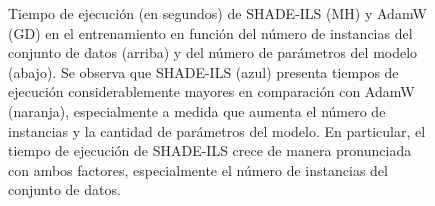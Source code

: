 \begin{figure}
    \centering
    \hfill
    \caption[Representación gráfica del tiempo de ejecución de los algoritmos SHADE-ILS y AdamW en función del número de parámetros del modelo]{Tiempo de ejecución (en segundos) de SHADE-ILS (MH) y AdamW (GD) en el entrenamiento en función del número de instancias del conjunto de datos (arriba) y del número de parámetros del modelo (abajo). Se observa que SHADE-ILS (azul) presenta tiempos de ejecución considerablemente mayores en comparación con AdamW (naranja), especialmente a medida que aumenta el número de instancias y la cantidad de parámetros del modelo. En particular, el tiempo de ejecución de SHADE-ILS crece de manera pronunciada con ambos factores, especialmente el número de instancias del conjunto de datos.}
    \label{fig:tiemposgraf}
\end{figure}


